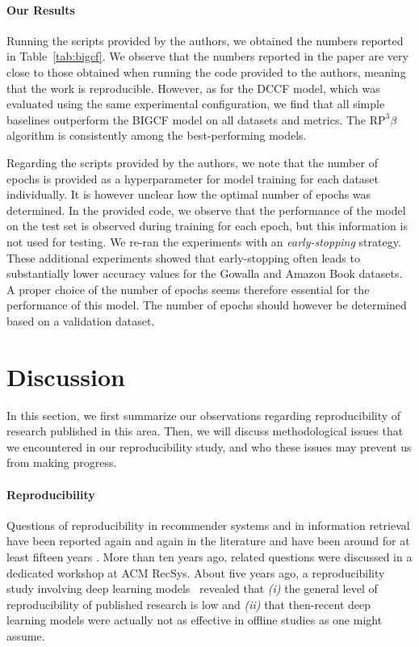 \documentclass[sigconf,natbib=true,nonacm]{acmart}
\newcommand{\pbeta}{\ensuremath{\text{RP}^3\!\beta}\xspace}
\begin{document}
\paragraph{Our Results} Running the scripts provided by the authors, we obtained the numbers reported in Table~\ref{tab:bigcf}. We observe that the numbers reported in the paper are very close to those obtained when running the code provided to the authors, meaning that the work is reproducible. However, as for the DCCF model, which was evaluated using the same experimental configuration, we find that all simple baselines outperform the BIGCF model on all datasets and metrics. The \pbeta algorithm is consistently among the best-performing models.

Regarding the scripts provided by the authors, we note that the number of epochs is provided as a hyperparameter for model training for each dataset individually. It is however unclear how the optimal number of epochs was determined. In the provided code, we observe that the performance of the model on the test set is observed during training for each epoch, but this information is not used for testing. We re-ran the experiments with an \emph{early-stopping} strategy. These additional experiments showed that early-stopping often leads to substantially lower accuracy values for the Gowalla and Amazon Book datasets. A proper choice of the number of epochs seems therefore essential for the performance of this model. The number of epochs should however be determined based on a validation dataset.

\section{Discussion}
\label{sec:discussion}
In this section, we first summarize our observations regarding reproducibility of research published in this area. Then, we will discuss methodological issues that we encountered in our reproducibility study, and who these issues may prevent us from making progress.

\paragraph{Reproducibility}
Questions of reproducibility in recommender systems and in information retrieval have been reported again and again in the literature and have been around for at least fifteen years \cite{Armstrong:2009:IDA:1645953.1646031,Ekstrand2011Rethinking,Konstan2013Toward,saidComparativeRecommenderSystem2014}. More than ten years ago, related questions were discussed in a dedicated workshop at ACM RecSys.
About five years ago, a reproducibility study involving deep learning models~\cite{ferraridacremaetal2019} revealed that \emph{(i)} the general level of reproducibility of published research is low and \emph{(ii)} that then-recent deep learning models were actually not as effective in offline studies as one might assume.
\end{document}
